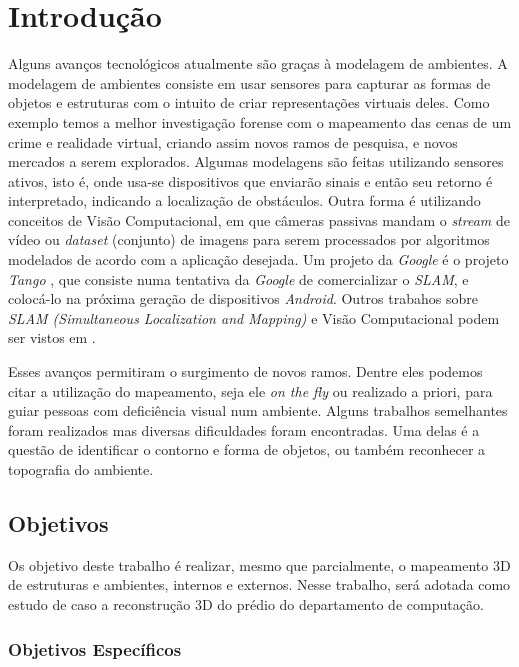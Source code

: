 \chapter{Introdução}

Alguns avanços tecnológicos atualmente são graças à modelagem de ambientes. A modelagem de ambientes consiste em usar sensores para capturar as formas de objetos e estruturas com o intuito de criar representações virtuais deles. Como exemplo temos a melhor investigação forense com o mapeamento das cenas de um crime \cite{FIT3D} e realidade virtual, criando assim novos ramos de pesquisa, e novos mercados a serem explorados. Algumas modelagens são feitas utilizando sensores ativos, isto é, onde usa-se dispositivos que enviarão sinais e então seu retorno é interpretado, indicando a localização de obstáculos. Outra forma é utilizando conceitos de Visão Computacional, em que câmeras passivas mandam o \textit{stream} de vídeo ou \textit{dataset} (conjunto) de imagens para serem processados por algoritmos modelados de acordo com a aplicação desejada. Um projeto da \textit{Google} é o projeto \textit{Tango} \cite{Tango}, que consiste numa tentativa da \textit{Google} de comercializar o \textit{SLAM}, e colocá-lo na próxima geração de dispositivos \textit{Android}. Outros trabahos sobre \textit{SLAM (Simultaneous Localization and Mapping)} e Visão Computacional podem ser vistos em \cite{Trabalhos-Geral-SLAM}.

Esses avanços permitiram o surgimento de novos ramos. Dentre eles podemos citar a utilização do mapeamento, seja ele \textit{on the fly} ou realizado a priori, para guiar pessoas com deficiência visual num ambiente. Alguns trabalhos semelhantes foram realizados mas diversas dificuldades foram encontradas. Uma delas é a questão de identificar o contorno e forma de objetos, ou também reconhecer a topografia do ambiente. 

\section{Objetivos}

Os objetivo deste trabalho é realizar, mesmo que parcialmente, o mapeamento 3D de estruturas e ambientes, internos e externos. Nesse trabalho, será adotada como estudo de caso a reconstrução 3D do prédio do departamento de computação.

\subsection{Objetivos Específicos}

